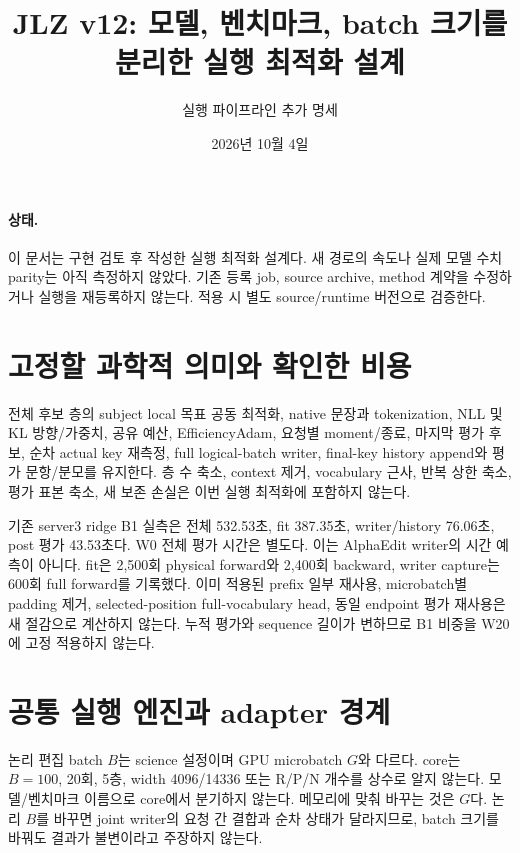 \documentclass[11pt]{article}
\title{JLZ v12: 모델, 벤치마크, batch 크기를 분리한 실행 최적화 설계}
\author{실행 파이프라인 추가 명세}
\date{2026년 10월 4일}
\begin{document}
\maketitle

\paragraph{상태.}
이 문서는 구현 검토 후 작성한 실행 최적화 설계다. 새 경로의 속도나 실제 모델
수치 parity는 아직 측정하지 않았다. 기존 등록 job, source archive, method 계약을
수정하거나 실행을 재등록하지 않는다. 적용 시 별도 source/runtime 버전으로 검증한다.

\section{고정할 과학적 의미와 확인한 비용}
전체 후보 층의 subject local 목표 공동 최적화, native 문장과 tokenization,
NLL 및 KL 방향/가중치, 공유 예산, EfficiencyAdam, 요청별 moment/종료,
마지막 평가 후보, 순차 actual key 재측정, full logical-batch writer,
final-key history append와 평가 문항/분모를 유지한다.
층 수 축소, context 제거, vocabulary 근사, 반복 상한 축소, 평가 표본 축소,
새 보존 손실은 이번 실행 최적화에 포함하지 않는다.

기존 server3 ridge B1 실측은 전체 532.53초, fit 387.35초,
writer/history 76.06초, post 평가 43.53초다. W0 전체 평가 시간은 별도다.
이는 AlphaEdit writer의 시간 예측이 아니다. fit은 2,500회 physical forward와
2,400회 backward, writer capture는 600회 full forward를 기록했다.
이미 적용된 prefix 일부 재사용, microbatch별 padding 제거,
selected-position full-vocabulary head, 동일 endpoint 평가 재사용은 새 절감으로
계산하지 않는다. 누적 평가와 sequence 길이가 변하므로 B1 비중을 W20에 고정 적용하지 않는다.

\section{공통 실행 엔진과 adapter 경계}
논리 편집 batch $B$는 science 설정이며 GPU microbatch $G$와 다르다.
core는 $B=100$, 20회, 5층, width 4096/14336 또는 R/P/N 개수를 상수로 알지 않는다.
모델/벤치마크 이름으로 core에서 분기하지 않는다.
메모리에 맞춰 바꾸는 것은 $G$다. 논리 $B$를 바꾸면 joint writer의 요청 간 결합과
순차 상태가 달라지므로, batch 크기를 바꿔도 결과가 불변이라고 주장하지 않는다.
\end{document}
